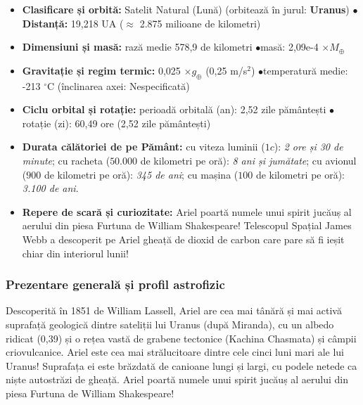 \begin{tcolorbox}[orbitardata, title={\textbf{Repere esențiale: Ariel}}]
\small
\begin{itemize}[leftmargin=1.4em, itemsep=2pt, topsep=2pt]
  \item \textbf{Clasificare și orbită:} Satelit Natural (Lună) (orbitează în jurul: \textbf{Uranus}) \quad$\bullet$\quad \textbf{Distanță:} 19,218 UA ($\approx$ 2.875 milioane de kilometri)
  \item \textbf{Dimensiuni și masă:} rază medie 578,9 de kilometri \quad$\bullet$\quad masă: 2,09e-4 $\times M_\oplus$
  \item \textbf{Gravitație și regim termic:} 0,025 $\times g_\oplus$ (0,25 m/s$^2$) \quad$\bullet$\quad temperatură medie: -213 $^\circ$C (înclinarea axei: Nespecificată)
  \item \textbf{Ciclu orbital și rotație:} perioadă orbitală (an): 2,52 zile pământești \quad$\bullet$\quad rotație (zi): 60,49 ore (2,52 zile pământești)
  \item \textbf{Durata călătoriei de pe Pământ:} cu viteza luminii ($1c$): \emph{2 ore și 30 de minute}; cu racheta ($50.000$ de kilometri pe oră): \emph{8 ani și jumătate}; cu avionul ($900$ de kilometri pe oră): \emph{345 de ani}; cu mașina ($100$ de kilometri pe oră): \emph{3.100 de ani}.
  \item \textbf{Repere de scară și curiozitate:} Ariel poartă numele unui spirit jucăuș al aerului din piesa \guillemotleft{}Furtuna\guillemotright{} de William Shakespeare! Telescopul Spațial James Webb a descoperit pe Ariel gheață de dioxid de carbon care pare să fi ieșit chiar din interiorul lunii!
\end{itemize}
\end{tcolorbox}

\subsubsection*{Prezentare generală și profil astrofizic}
Descoperită în 1851 de William Lassell, Ariel are cea mai tânără și mai activă suprafață geologică dintre sateliții lui Uranus (după Miranda), cu un albedo ridicat (0,39) și o rețea vastă de grabene tectonice (Kachina Chasmata) și câmpii criovulcanice. Ariel este cea mai strălucitoare dintre cele cinci luni mari ale lui Uranus! Suprafața ei este brăzdată de canioane lungi și largi, cu podele netede ca niște autostrăzi de gheață. Ariel poartă numele unui spirit jucăuș al aerului din piesa \guillemotleft{}Furtuna\guillemotright{} de William Shakespeare!


